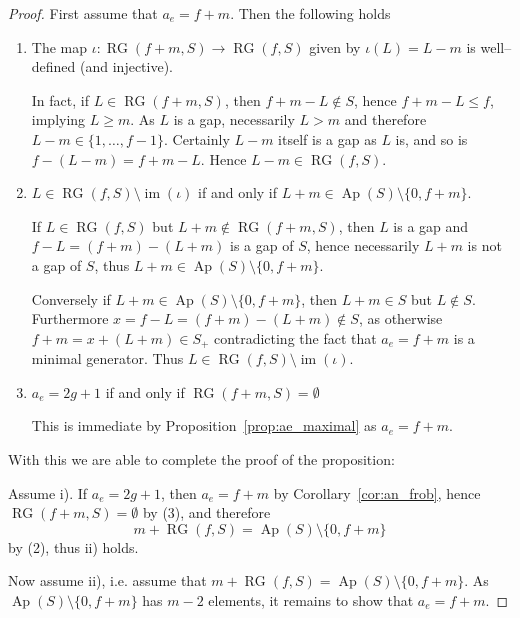 \documentclass[a4paper,12pt,scrbook]{amsart}
\theoremstyle{plain}%
\theoremstyle{definition}
\begin{document}
\begin{proof}
First assume that $a_e = f+m$. Then the following holds 

\begin{enumerate}
\item The map $\iota: \operatorname{RG}(f+m, S) \longrightarrow 
\operatorname{RG}(f, S)$ given by $\iota(L) = L-m$ is well--defined (and injective). 

In fact, if $L \in \operatorname{RG}(f+m, S)$, then $f+m-L \notin S$, hence 
$f+m-L  \leq f$, implying $L \geq m$. As $L$ is a gap, necessarily $L > m$ and 
therefore $L-m \in \{1, \ldots, f-1\}$. Certainly $L-m$ itself is a gap as $L$ is, and so is 
$f-(L-m)=f+m-L$. Hence $L-m \in \operatorname{RG}(f, S)$. 
\item $L \in \operatorname{RG}(f, S) \setminus \operatorname{im}(\iota)$ if and only 
if $L + m \in \operatorname{Ap}(S) \setminus \{0, f+m\}$. 

If $L \in \operatorname{RG}(f, S)$ but $L+m \notin  \operatorname{RG}(f+m, S)$, 
then $L$ is a gap and $f-L = (f+m) - (L+m)$ is a gap of $S$, hence necessarily 
$L+m$ is not a gap of $S$, thus $L + m \in \operatorname{Ap}(S)\setminus \{0, f+m\}$. 

Conversely if $L+m  \in \operatorname{Ap}(S) \setminus \{0, f+m\}$, then 
$L+m \in S$ but $L \notin S$. Furthermore $x=f-L = (f+m) - (L+m) \notin S$, as 
otherwise $f+m = x+(L+m) \in S_+$ contradicting the fact that $a_e = f+m$ is a minimal 
generator. Thus $L \in \operatorname{RG}(f, S) \setminus \operatorname{im}(\iota)$. 
\item $a_e = 2g+1$ if and only if $\operatorname{RG}(f+m, S) = \emptyset$

This is immediate by Proposition~\ref{prop:ae_maximal} as $a_e = f+m$.  
\end{enumerate}
\bigbreak

With this we are able to complete the proof of the proposition: 

Assume i). If $a_e = 2g+1$, then $a_e = f+ m$ by 
Corollary~\ref{cor:an_frob}, hence 
$\operatorname{RG}(f+m, S) = \emptyset$ by (3), and therefore 
	$$ m+\operatorname{RG}(f, S) 
	= \operatorname{Ap}(S) \setminus \{0, f+m\} $$ 
by (2), thus ii) holds.
 
Now assume ii), i.e. assume that $m+\operatorname{RG}(f, S) = 
\operatorname{Ap}(S) \setminus \{0, f+m\}$. 
As $\operatorname{Ap}(S) \setminus \{0, f+m\} $ has $m-2$ 
elements, it remains to show that $a_e = f+m$. 


\end{proof}
\end{document}
